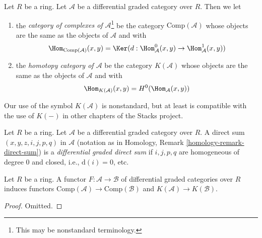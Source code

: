 \begin{definition}
\label{definition-homotopy-category-of-dga-category}
Let $R$ be a ring. Let $\mathcal{A}$ be a differential graded category
over $R$. Then we let
\begin{enumerate}
\item the {\it category of complexes of $\mathcal{A}$}\footnote{This may
be nonstandard terminology.} be the category
$\text{Comp}(\mathcal{A})$ whose objects are the same as the objects
of $\mathcal{A}$ and with
$$
\Hom_{\text{Comp}(\mathcal{A})}(x, y) =
\Ker(d : \Hom^0_\mathcal{A}(x, y) \to \Hom^1_\mathcal{A}(x, y))
$$
\item the {\it homotopy category of $\mathcal{A}$} be the category
$K(\mathcal{A})$ whose objects are the same as the objects
of $\mathcal{A}$ and with
$$
\Hom_{K(\mathcal{A})}(x, y) = H^0(\Hom_\mathcal{A}(x, y))
$$
\end{enumerate}
\end{definition}

\noindent
Our use of the symbol $K(\mathcal{A})$ is nonstandard, but at least
is compatible with the use of $K(-)$ in other chapters of the Stacks project.

\begin{definition}
\label{definition-dg-direct-sum}
Let $R$ be a ring. Let $\mathcal{A}$ be a differential graded category over
$R$. A direct sum $(x, y, z, i, j, p, q)$ in $\mathcal{A}$ (notation as in
Homology, Remark \ref{homology-remark-direct-sum})
is a {\it differential graded direct sum} if $i, j, p, q$ are homogeneous
of degree $0$ and closed, i.e., $\text{d}(i) = 0$, etc.
\end{definition}

\begin{lemma}
\label{lemma-functorial}
Let $R$ be a ring. A functor $F : \mathcal{A} \to \mathcal{B}$
of differential graded categories over $R$ induces functors
$\text{Comp}(\mathcal{A}) \to \text{Comp}(\mathcal{B})$
and $K(\mathcal{A}) \to K(\mathcal{B})$.
\end{lemma}

\begin{proof}
Omitted.
\end{proof}

